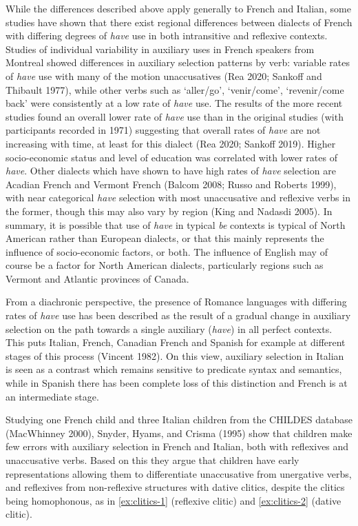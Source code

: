 \documentclass[
  12pt,
]{article}
\begin{document}
While the differences described above apply generally to French and Italian, some studies have shown that there exist regional differences between dialects of French with differing degrees of \emph{have} use in both intransitive and reflexive contexts. Studies of individual variability in auxiliary uses in French speakers from Montreal showed differences in auxiliary selection patterns by verb: variable rates of \emph{have} use with many of the motion unaccusatives (Rea 2020; Sankoff and Thibault 1977), while other verbs such as `aller/go', `venir/come', `revenir/come back' were consistently at a low rate of \emph{have} use. The results of the more recent studies found an overall lower rate of \emph{have} use than in the original studies (with participants recorded in 1971) suggesting that overall rates of \emph{have} are not increasing with time, at least for this dialect (Rea 2020; Sankoff 2019). Higher socio-economic status and level of education was correlated with lower rates of \emph{have}.
Other dialects which have shown to have high rates of \emph{have} selection are Acadian French and Vermont French (Balcom 2008; Russo and Roberts 1999), with near categorical \emph{have} selection with most unaccusative and reflexive verbs in the former, though this may also vary by region (King and Nadasdi 2005).
In summary, it is possible that use of \emph{have} in typical \emph{be} contexts is typical of North American rather than European dialects, or that this mainly represents the influence of socio-economic factors, or both. The influence of English may of course be a factor for North American dialects, particularly regions such as Vermont and Atlantic provinces of Canada.

From a diachronic perspective, the presence of Romance languages with differing rates of \emph{have} use has been described as the result of a gradual change in auxiliary selection on the path towards a single auxiliary (\emph{have}) in all perfect contexts. This puts Italian, French, Canadian French and Spanish for example at different stages of this process (Vincent 1982). On this view, auxiliary selection in Italian is seen as a contrast which remains sensitive to predicate syntax and semantics, while in Spanish there has been complete loss of this distinction and French is at an intermediate stage.

Studying one French child and three Italian children from the CHILDES database (MacWhinney 2000), Snyder, Hyams, and Crisma (1995) show that children make few errors with auxiliary selection in French and Italian, both with reflexives and unaccusative verbs. Based on this they argue that children have early representations allowing them to differentiate unaccusative from unergative verbs, and reflexives from non-reflexive structures with dative clitics, despite the clitics being homophonous, as in \ref{ex:clitics-1} (reflexive clitic) and \ref{ex:clitics-2} (dative clitic).
\end{document}
